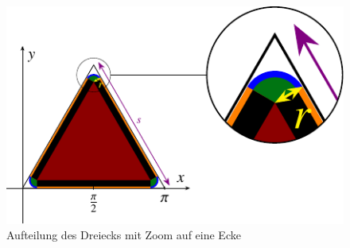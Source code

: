 \begin{figure}
	\centering
	\includegraphics{papers/antennen/images/aufteilungDreieckZoom.pdf}
	\caption{Aufteilung des Dreiecks mit Zoom auf eine Ecke}
	\label{antennen:tikzdreieckAufteilung}
\end{figure}